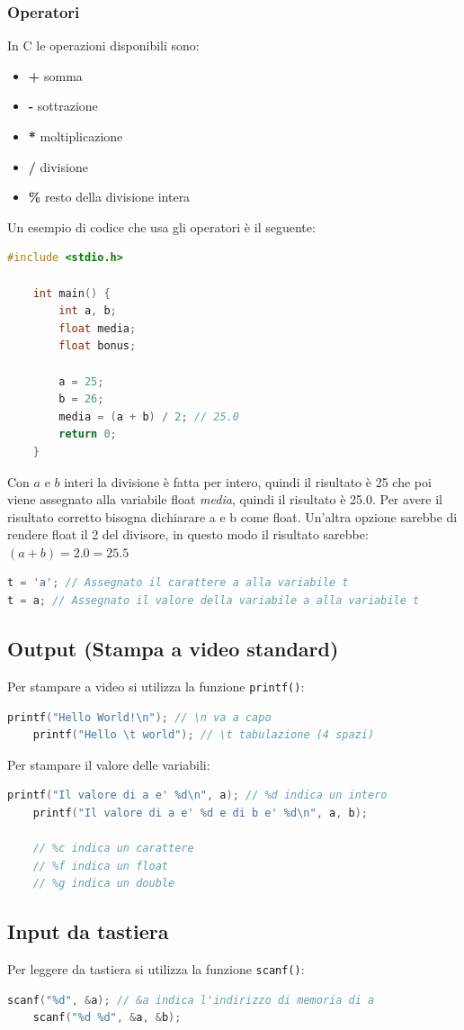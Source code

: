 \documentclass[a4paper]{article}
\theoremstyle{break}
\theoremstyle{break}
\theoremstyle{break}
\theoremstyle{break}
\begin{document}
\subsubsection{Operatori}
In C le operazioni disponibili sono:
\begin{itemize}
	\item \textbf{+} somma
	\item \textbf{-} sottrazione
	\item \textbf{*} moltiplicazione
	\item \textbf{/} divisione
	\item \textbf{\%} resto della divisione intera
\end{itemize}
Un esempio di codice che usa gli operatori è il seguente:
\begin{lstlisting}[language=C]
    #include <stdio.h>

    int main() {
        int a, b;
        float media;
        float bonus;

        a = 25;
        b = 26;
        media = (a + b) / 2; // 25.0
        return 0;
    }
\end{lstlisting}
Con \( a \) e \( b \) interi la divisione è fatta per intero, quindi il risultato è 25
che poi viene assegnato alla variabile float \emph{media}, quindi il risultato è 25.0.
Per avere il risultato corretto bisogna dichiarare a e b come float. Un'altra opzione
sarebbe di rendere float il 2 del divisore, in questo modo il risultato sarebbe:
\( (a+b)=2.0=25.5 \)

\begin{define}
	\begin{lstlisting}[language=C]
t = 'a'; // Assegnato il carattere a alla variabile t
t = a; // Assegnato il valore della variabile a alla variabile t
	\end{lstlisting}
\end{define}

\subsection{Output (Stampa a video standard)}
Per stampare a video si utilizza la funzione \texttt{printf()}:
\begin{lstlisting}[language=C]
    printf("Hello World!\n"); // \n va a capo
    printf("Hello \t world"); // \t tabulazione (4 spazi)
\end{lstlisting}
Per stampare il valore delle variabili:
\begin{lstlisting}[language=C]
    printf("Il valore di a e' %d\n", a); // %d indica un intero
    printf("Il valore di a e' %d e di b e' %d\n", a, b);

    // %c indica un carattere
    // %f indica un float
    // %g indica un double
\end{lstlisting}

\subsection{Input da tastiera}
Per leggere da tastiera si utilizza la funzione \texttt{scanf()}:
\begin{lstlisting}[language=C]
    scanf("%d", &a); // &a indica l'indirizzo di memoria di a
    scanf("%d %d", &a, &b);
\end{lstlisting}
\end{document}
